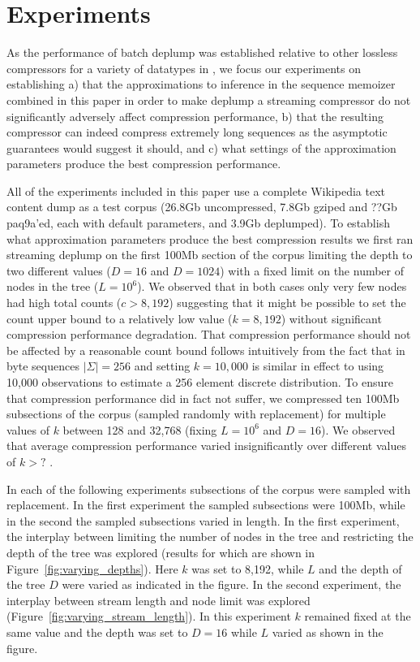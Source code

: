 \section{Experiments}
\label{sec:experiments}

As the performance of batch deplump was established relative to other lossless compressors for a variety of datatypes in \citep{Gasthaus2010}, we focus our experiments on establishing a) that the approximations to inference in the sequence memoizer combined in this paper in order to make deplump a streaming compressor do not significantly adversely affect compression performance, b) that the resulting compressor can indeed compress extremely long sequences as the asymptotic guarantees would suggest it should, and c) what settings of the approximation parameters produce the best compression performance.

All of the experiments included in this paper use a complete Wikipedia text content dump \citep{Wikipedia} as a test corpus (26.8Gb uncompressed, 7.8Gb gziped and ??Gb paq9a'ed, each with default parameters, and 3.9Gb deplumped).  To establish what approximation parameters produce the best compression results we first ran streaming deplump on the first 100Mb section of the corpus limiting the depth to two different values ($D=16$ and $D=1024$) with a fixed limit on the number of nodes in the tree ($L=10^6$).  We observed that in both cases only very few nodes had high total counts ($c > 8,192$) suggesting that it might be possible to set the count upper bound to a relatively low value ($k= 8,192$) without significant compression performance degradation.  That compression performance should not be affected by a reasonable count bound follows intuitively from the fact that in byte sequences $|\Sigma| = 256$ and setting $k=10,000$ is similar in effect to using 10,000 observations to estimate a 256 element discrete distribution.  To ensure that compression performance did in fact not suffer, we compressed ten 100Mb subsections of the corpus (sampled randomly with replacement) for multiple values of $k$ between 128 and 32,768 (fixing $L=10^6$ and $D=16$).  We observed that average compression performance varied insignificantly over different values of $k>?$ .

 In each of the following experiments subsections of the corpus were sampled with replacement.  In the first experiment the sampled subsections were 100Mb, while in the second the sampled subsections varied in length.  In the first experiment, the interplay between limiting the number of nodes in the tree and restricting the depth of the tree was explored (results for which are shown in Figure~\ref{fig:varying_depths}).  Here $k$ was set to 8,192, while $L$ and the depth of the tree $D$ were varied as indicated in the figure.  In the second experiment, the interplay between stream length and node limit was explored (Figure~\ref{fig:varying_stream_length}).  In this experiment $k$ remained fixed at the same value and the depth was set to $D=16$ while $L$ varied as shown in the figure.  

